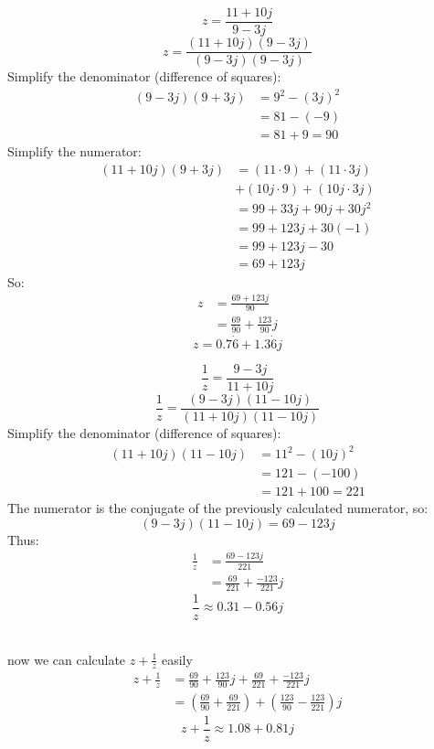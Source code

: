 \documentclass[a4paper, 12pt]{report}
\begin{document}
    \begin{minipage}[t]{0.4\textwidth}
        \[z = \frac{11 + 10j}{9 - 3j}\]    
        \[z = \frac{(11 + 10j)(9 - 3j)}{(9 - 3j)(9 - 3j)}\]
        Simplify the denominator (difference of squares):
        \begin{align*}
            (9 - 3j)(9 + 3j) &= 9^2 - (3j)^2\\ 
            &= 81 - (-9)\\ 
            &= 81 + 9 = 90
         \end{align*}
        Simplify the numerator:
        \begin{align*}
            (11 + 10j)(9 + 3j) &= (11 \cdot 9) + (11 \cdot 3j)\\ &+ (10j \cdot 9) + (10j \cdot 3j)\\[8pt] 
            &= 99 + 33j + 90j + 30j^2\\ 
            &= 99 + 123j + 30(-1)\\ 
            &= 99 + 123j - 30 \\
            &= 69 + 123j   
        \end{align*}
        So:
        \begin{align*}
            z &= \frac{69 + 123j}{90}\\[8pt]
            &= \frac{69}{90} + \frac{123}{90}j
        \end{align*}
        \[z= 0.7\dot{6}+1.3\dot{6} j\]
    \end{minipage}\hfil%
    \begin{minipage}[t]{0.4\textwidth}
        \[\frac{1}{z} = \frac{9 - 3j}{11 + 10j}\]
        \[\frac{1}{z} = \frac{(9 - 3j)(11 - 10j)}{(11 + 10j)(11 - 10j)}\]
        Simplify the denominator (difference of squares):
        \begin{align*}
            (11 + 10j)(11 - 10j) &= 11^2 - (10j)^2\\
            &= 121 - (-100)\\
            &= 121 + 100 = 221
        \end{align*}
        The numerator is the conjugate of the previously calculated numerator, so:        
        \[(9 - 3j)(11 - 10j) = 69 - 123j\]
        Thus:
        \begin{align*}
            \frac{1}{z} &= \frac{69 - 123j}{221}\\[8pt]
            &= \frac{69}{221} + \frac{-123}{221}j
        \end{align*}
        \[\boxed{\frac{1}{z}\approx 0.31 - 0.56j}\]
    \end{minipage}\\
    \vspace{2em}
    now we can calculate $z + \frac{1}{z}$ easily
        \begin{align*}
            z+\frac{1}{z} &= \frac{69}{90} + \frac{123}{90}j + \frac{69}{221} + \frac{-123}{221}j\\[8pt]
            &= \left(\frac{69}{90}+\frac{69}{221}\right) + \left(\frac{123}{90}- \frac{123}{221}\right)j
    \end{align*}
    \[\boxed{z+\frac{1}{z}\approx 1.08 + 0.81 j}\]
   
\end{document}
